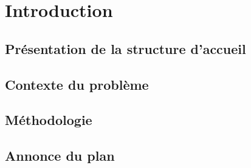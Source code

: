 \hypertarget{Introduction}{%
\chapter{Introduction}\label{Introduction}}

\section{Présentation de la structure
d'accueil}


\hypertarget{Contexte du problème}{%
\section{Contexte du problème}\label{problematique}}



\hypertarget{Méthodologie}{%
\section{Méthodologie}\label{Méthodologie}}

\hypertarget{Annonce du plan}{%
\section{Annonce du plan}\label{annonce du plan}}
